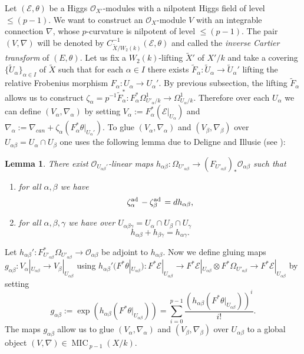 \documentclass[12pt]{article}
\theoremstyle{plain}
\newtheorem{Lemma}[Thm]{\sc Lemma}
\theoremstyle{definition}
\theoremstyle{remark}
\newcommand{\cE}{{\mathcal E}}
\newcommand{\cO}{{\mathcal O}}
\newcommand{\Mic}{{\mathop{\operatorname{MIC}\, }}}
\newcommand{\ad}{{\mathop{\rm ad \, }}}
\begin{document}
Let $(\cE, \theta)$ be a  Higgs $\cO_{X'}$-modules with a nilpotent Higgs field of level $\le (p-1)$.
We want to construct  an $\cO_X$-module $V$ with an integrable
connection $\nabla$, whose $p$-curvature is nilpotent of level $\le (p-1)$.
The pair  $(V, \nabla)$ will be denoted by $C^{-1}_{\tilde X/W_2(k)}(\cE,\theta)$
and called the \emph{inverse Cartier transform} of $(E, \theta)$. Let us fix a $W_2(k)$-lifting $\tilde X'$ of $X'/k$ and  take a covering $\{\tilde U_{\alpha}\} _{\alpha\in I}$ of $\tilde X$ such that  for each $\alpha \in I$ there exists $\tilde F_{\alpha}: \tilde U_{\alpha}\to \tilde U_{\alpha}'$ lifting 
the relative Frobenius morphism  $F_{\alpha}: U_{\alpha}\to U_{\alpha}'$.
By previous subsection, the lifting  $\tilde F_{\alpha}$ allows us to construct
$ \zeta _{\alpha}=p^{-1}\tilde F_{\alpha}^*: F^*_{\alpha}\Omega_{U'_{\alpha}/k}^1\to \Omega_{U_{\alpha}/k}^1.$
Therefore over each $U_{\alpha}$ we can define $(V_{\alpha}, \nabla_{\alpha})$ by setting
$V_{\alpha}:=F^*_{\alpha}(\cE|_{U_{\alpha}})$
and
$\nabla_{\alpha}:= \nabla_{can}+\zeta_{\alpha}(F^*_{\alpha}\theta|_{U_{\alpha}'}).$
To glue $(V_{\alpha}, \nabla_{\alpha})$ and $(V_{\beta}, \nabla_{\beta})$ over $U_{\alpha\beta}=U_{\alpha}\cap U_{\beta}$ one uses  the following lemma due to Deligne and Illusie (see \cite{DI}):

\begin{Lemma}
	There exist $\cO_{U_{\alpha\beta}'}$-linear maps $h_{\alpha\beta}: \Omega _{U'_{\alpha\beta}}\to (F_{U'_{\alpha\beta}})_* \cO_{\alpha\beta}$ such that
	\begin{enumerate}
		\item  for all $\alpha,\beta$ we have 
		$$\zeta_{\alpha}^{\ad}-\zeta_{\beta}^{\ad }=dh_{\alpha\beta},$$
		\item  for all $\alpha,\beta,\gamma$ we have over $U_{\alpha\beta\gamma}=U_{\alpha}\cap U_{\beta}\cap U_{\gamma}$
		$$h_{\alpha\beta}+h_{\beta\gamma}=h_{\alpha\gamma}.$$
	\end{enumerate}
\end{Lemma}

Let $h_{\alpha\beta}': F_{U'_{\alpha\beta}}^*\Omega _{U'_{\alpha\beta}}\to  \cO_{\alpha\beta}$ be adjoint to $h_{\alpha\beta}$. 
Now we define gluing maps $g_{\alpha\beta}:V_{\alpha}|_{U_{\alpha\beta}}\to V_{\beta}|_{U_{\alpha\beta}}$
using
$h_{\alpha\beta}'(F^*\theta |_{U_{\alpha\beta}}): F^*\cE|_{U_{\alpha\beta}}\to F^*\cE|_{U_{\alpha\beta}}\otimes F^*\Omega_{U'_{\alpha\beta}}\to F^*\cE|_{U_{\alpha\beta}}$
by setting
$$g_{\alpha\beta}:=\exp (h_{\alpha\beta}(F^*\theta |_{U_{\alpha\beta}}))=\sum_{i=0}^{p-1}\frac{(h_{\alpha\beta}(F^*\theta |_{U_{\alpha\beta}}))^i}{i!}.$$
The maps $g_{\alpha\beta}$ allow us to glue $(V_{\alpha}, \nabla_{\alpha})$ and $(V_{\beta}, \nabla_{\beta})$ over $U_{\alpha\beta}$ to a global object $(V, \nabla)\in \Mic_{p-1}(X/k)$.
\end{document}
